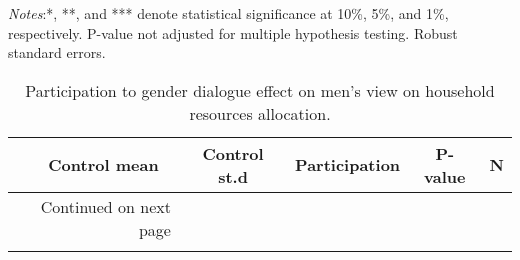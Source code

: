 \documentclass[10pt,a4paper, margin=1in]{article}
\begin{document}
\begin{center}
	{\tiny \tabcolsep=1pt  %
		\begin{ThreePartTable}
			\begin{TableNotes}[flushleft]
				\tiny
				\item \textit{Notes}:*, **, and *** denote statistical significance at 10\%, 5\%, and 1\%, respectively. P-value not adjusted for multiple hypothesis testing. Robust standard errors.
			\end{TableNotes}
			\begin{longtable}{l*{5}{c}}
				\caption{Participation to gender dialogue effect on men's view on household resources allocation.}\label{tab:balance_omni}					\\
				\toprule
				\hline 
				&\multicolumn{1}{p{1cm}}{\centering Control mean}
				&\multicolumn{1}{p{1cm}}{\centering Control st.d}
				&\multicolumn{1}{p{2cm}}{\centering Participation}
				&\multicolumn{1}{p{1cm}}{\centering P-value}
				&\multicolumn{1}{p{1cm}}{\centering N} \\
				\hline 
				\endfirsthead
				\hline
				\endhead
				\hline
				\multicolumn{2}{r}{{Continued on next page}} \\
				\endfoot
				
				\bottomrule
				\insertTableNotes
				\endlastfoot
				
			\end{longtable}
		\end{ThreePartTable}
	}
\end{center}
\end{document}
